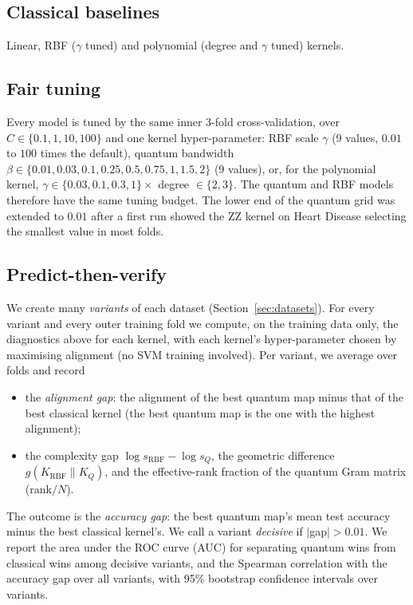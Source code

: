 \documentclass[11pt,a4paper]{article}
\begin{document}
\subsection{Classical baselines}
Linear, RBF ($\gamma$ tuned) and polynomial (degree and $\gamma$ tuned) kernels.

\subsection{Fair tuning}
Every model is tuned by the same inner 3-fold cross-validation, over $C\in\{0.1,1,10,100\}$ and one kernel hyper-parameter: RBF scale $\gamma$ (9 values, $0.01$ to $100$ times the default), quantum bandwidth $\beta\in\{0.01,0.03,0.1,0.25,0.5,0.75,1,1.5,2\}$ (9 values), or, for the polynomial kernel, $\gamma\in\{0.03,0.1,0.3,1\}\times$ degree $\in\{2,3\}$. The quantum and RBF models therefore have the same tuning budget. The lower end of the quantum grid was extended to $0.01$ after a first run showed the ZZ kernel on Heart Disease selecting the smallest value in most folds.

\subsection{Predict-then-verify}\label{sec:pv}
We create many \emph{variants} of each dataset (Section~\ref{sec:datasets}). For every variant and every outer training fold we compute, on the training data only, the diagnostics above for each kernel, with each kernel's hyper-parameter chosen by maximising alignment (no SVM training involved). Per variant, we average over folds and record
\begin{itemize}
  \item the \emph{alignment gap}: the alignment of the best quantum map minus that of the best classical kernel (the best quantum map is the one with the highest alignment);
  \item the complexity gap $\log s_{\mathrm{RBF}}-\log s_Q$, the geometric difference $g(K_{\mathrm{RBF}}\|K_Q)$, and the effective-rank fraction of the quantum Gram matrix (rank$/N$).
\end{itemize}
The outcome is the \emph{accuracy gap}: the best quantum map's mean test accuracy minus the best classical kernel's. We call a variant \emph{decisive} if $|$gap$|>0.01$. We report the area under the ROC curve (AUC) for separating quantum wins from classical wins among decisive variants, and the Spearman correlation with the accuracy gap over all variants, with 95\% bootstrap confidence intervals over variants.
\end{document}
